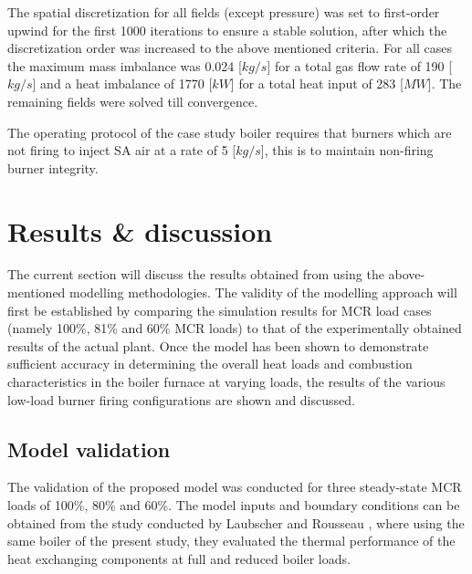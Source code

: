 \documentclass[review]{elsarticle}
\begin{document}
The spatial discretization for all fields (except pressure) was set to first-order upwind for the first 1000 iterations to ensure a stable solution, after which the discretization order was increased to the above mentioned criteria. For all cases the maximum mass imbalance was 0.024 [$kg/s$] for a total gas flow rate of 190 [$kg/s$] and a heat imbalance of 1770 [$kW$] for a total heat input of 283 [$MW$]. The remaining fields were solved till convergence.

The operating protocol of the case study boiler requires that burners which are not firing to inject SA air at a rate of 5 [$kg/s$], this is to maintain non-firing burner integrity. 

\section{Results \& discussion}
The current section will discuss the results obtained from using the above-mentioned modelling methodologies. The validity of the modelling approach will first be established by comparing the simulation results for MCR load cases (namely 100\%, 81\% and 60\% MCR loads) to that of the experimentally obtained results of the actual plant. Once the model has been shown to demonstrate sufficient accuracy in determining the overall heat loads and combustion characteristics in the boiler furnace at varying loads, the results of the various low-load burner firing configurations are shown and discussed.

\subsection{Model validation}\label{sec_model_valid}

The validation of the proposed model was conducted for three steady-state MCR loads of 100\%, 80\% and 60\%. The model inputs and boundary conditions can be obtained from the study conducted by Laubscher and Rousseau \citep{Laubscher2019b}, where using the same boiler of the present study, they evaluated the thermal performance of the heat exchanging components at full and reduced boiler loads.
\end{document}
